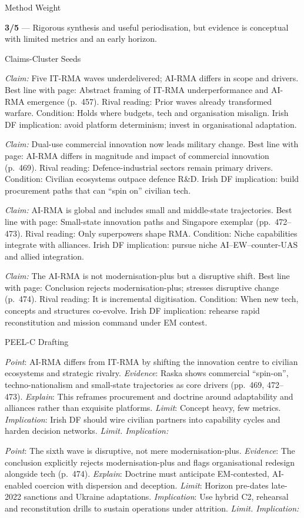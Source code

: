 Method Weight

\textbf{3/5} — Rigorous synthesis and useful periodisation, but evidence is conceptual with limited metrics and an early horizon.

Claims-Cluster Seeds

\textit{Claim:} Five IT-RMA waves underdelivered; AI-RMA differs in scope and drivers.
Best line with page: Abstract framing of IT-RMA underperformance and AI-RMA emergence (p.~457).
Rival reading: Prior waves already transformed warfare.
Condition: Holds where budgets, tech and organisation misalign.
Irish DF implication: avoid platform determinism; invest in organisational adaptation.

\textit{Claim:} Dual-use commercial innovation now leads military change.
Best line with page: AI-RMA differs in magnitude and impact of commercial innovation (p.~469).
Rival reading: Defence-industrial sectors remain primary drivers.
Condition: Civilian ecosystems outpace defence R&D.
Irish DF implication: build procurement paths that can “spin on” civilian tech.

\textit{Claim:} AI-RMA is global and includes small and middle-state trajectories.
Best line with page: Small-state innovation paths and Singapore exemplar (pp.~472–473).
Rival reading: Only superpowers shape RMA.
Condition: Niche capabilities integrate with alliances.
Irish DF implication: pursue niche AI–EW–counter-UAS and allied integration.

\textit{Claim:} The AI-RMA is not modernisation-plus but a disruptive shift.
Best line with page: Conclusion rejects modernisation-plus; stresses disruptive change (p.~474).
Rival reading: It is incremental digitisation.
Condition: When new tech, concepts and structures co-evolve.
Irish DF implication: rehearse rapid reconstitution and mission command under EM contest.

PEEL-C Drafting

\textit{Point}: AI-RMA differs from IT-RMA by shifting the innovation centre to civilian ecosystems and strategic rivalry.
\textit{Evidence}: Raska shows commercial “spin-on”, techno-nationalism and small-state trajectories as core drivers (pp.~469, 472–473).
\textit{Explain}: This reframes procurement and doctrine around adaptability and alliances rather than exquisite platforms.
\textit{Limit}: Concept heavy, few metrics.
\textit{Implication}: Irish DF should wire civilian partners into capability cycles and harden decision networks.
\textit{Limit. Implication:}

\textit{Point}: The sixth wave is disruptive, not mere modernisation-plus.
\textit{Evidence}: The conclusion explicitly rejects modernisation-plus and flags organisational redesign alongside tech (p.~474).
\textit{Explain}: Doctrine must anticipate EM-contested, AI-enabled coercion with dispersion and deception.
\textit{Limit}: Horizon pre-dates late-2022 sanctions and Ukraine adaptations.
\textit{Implication}: Use hybrid C2, rehearsal and reconstitution drills to sustain operations under attrition.
\textit{Limit. Implication:}


